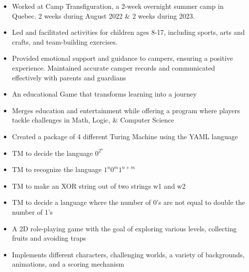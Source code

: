 \documentclass[10pt,a4paper,ragged2e,withhyper]{altacv}
\begin{document}
\begin{paracol}{2}
\begin{itemize}
    \item Worked at Camp Transfiguration, a 2-week overnight summer camp in Quebec. 2 weeks during August 2022 \& 2 weeks during 2023. 
    \item Led and facilitated activities for children ages 8-17, including sports, arts and crafts, and team-building exercises. 
    \item Provided emotional support and guidance to campers, ensuring a positive experience. Maintained accurate camper records and communicated effectively with parents and guardians
\end{itemize}


\switchcolumn



\begin{itemize}
    \item An educational Game that transforms learning into a journey 
    \item Merges education and entertainment while offering a program where players tackle challenges in Math, Logic, \& Computer Science
\end{itemize}

\begin{itemize}
    \item Created a package of 4 different Turing Machine using the YAML language
    \item TM to decide the language $0^{2^{n}}$
    \item TM to recognize the language $1^{n} 0^{m} 1^{n+m}$
    \item TM to make an XOR string out of two strings w1 and w2
    \item TM to decide a language where the number of 0's are not equal to double the number of 1's
\end{itemize}

\begin{itemize}
    \item A 2D role-playing game with the goal of exploring various levels, collecting fruits and avoiding traps
    \item Implements different characters, challenging worlds, a variety of backgrounds, animations, and a scoring mechanism 
\end{itemize}


\end{paracol}
\end{document}
